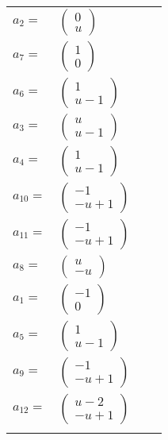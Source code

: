 \documentclass[1p]{elsarticle_modified}
\theoremstyle{definition}
\begin{document}
\begin{tabular}{m{7pt} m{180pt} m{7pt} m{180pt} }
\flushright $a_{2}=$&$\begin{pmatrix}0\\u\end{pmatrix}$ \\
\flushright $a_{7}=$&$\begin{pmatrix}1\\0\end{pmatrix}$ \\
\flushright $a_{6}=$&$\begin{pmatrix}1\\u-1\end{pmatrix}$ \\
\flushright $a_{3}=$&$\begin{pmatrix}u\\u-1\end{pmatrix}$ \\
\flushright $a_{4}=$&$\begin{pmatrix}1\\u-1\end{pmatrix}$ \\
\flushright $a_{10}=$&$\begin{pmatrix}-1\\- u+1\end{pmatrix}$ \\
\flushright $a_{11}=$&$\begin{pmatrix}-1\\- u+1\end{pmatrix}$ \\
\flushright $a_{8}=$&$\begin{pmatrix}u\\- u\end{pmatrix}$ \\
\flushright $a_{1}=$&$\begin{pmatrix}-1\\0\end{pmatrix}$ \\
\flushright $a_{5}=$&$\begin{pmatrix}1\\u-1\end{pmatrix}$ \\
\flushright $a_{9}=$&$\begin{pmatrix}-1\\- u+1\end{pmatrix}$ \\
\flushright $a_{12}=$&$\begin{pmatrix}u-2\\- u+1\end{pmatrix}$\\&\end{tabular}
\end{document}

